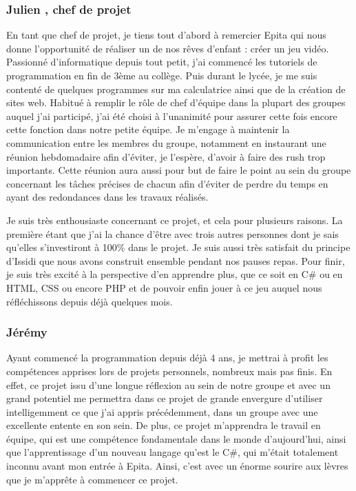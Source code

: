 ﻿\documentclass[12pt]{article}
\begin{document}
\subsubsection{Julien , chef de projet}
En tant que chef de projet, je tiens tout d'abord à remercier Epita qui nous
donne l'opportunité de réaliser un de nos rêves d'enfant : créer un jeu vidéo.
Passionné d'informatique depuis tout petit, j'ai commencé les tutoriels de
programmation en fin de 3ème au collège. Puis durant le lycée, je me suis contenté
de quelques programmes sur ma calculatrice ainsi que de la création de sites web.
Habitué à remplir le rôle de chef d'équipe dans la plupart des groupes auquel
j'ai participé, j'ai été choisi à l'unanimité pour assurer cette fois encore
cette fonction dans notre petite équipe. Je m'engage à maintenir la communication
entre les membres du groupe, notamment en instaurant une réunion hebdomadaire afin
d'éviter, je l'espère, d'avoir à faire des rush trop importants. Cette réunion aura
aussi pour but de faire le point au sein du groupe concernant les tâches précises 
de chacun afin d'éviter de perdre du temps en ayant des redondances dans les travaux
réalisés.

Je suis très enthousiaste concernant ce projet, et cela pour plusieurs raisons.
La première étant que j'ai la chance d'être avec trois autres personnes dont je sais
qu'elles s'investiront à 100\% dans le projet. Je suis aussi très satisfait du principe
d'Issidi que nous avons construit ensemble pendant nos pauses repas. Pour finir, je
suis très excité à la perspective d'en apprendre plus, que ce soit en C\# ou en HTML,
CSS ou encore PHP et de pouvoir enfin jouer à ce jeu auquel nous réfléchissons depuis
déjà quelques mois.

\subsubsection{Jérémy }
Ayant commencé la programmation depuis déjà 4 ans, je mettrai à profit les compétences
apprises lors de projets personnels, nombreux mais pas finis. En effet, ce projet issu
d'une longue réflexion au sein de notre groupe et avec un grand potentiel me permettra
dans ce projet de grande envergure d'utiliser intelligemment ce que j'ai appris précédemment,
dans un groupe avec une excellente entente en son sein. De plus, ce projet m'apprendra
le travail en équipe, qui est une compétence fondamentale dans le monde d'aujourd'hui,
ainsi que l'apprentissage d'un nouveau langage qu'est le C\#, qui m'était totalement
inconnu avant mon entrée à Epita. Ainsi, c'est avec un énorme sourire aux lèvres que
je m'apprête à commencer ce projet. 
\end{document}
